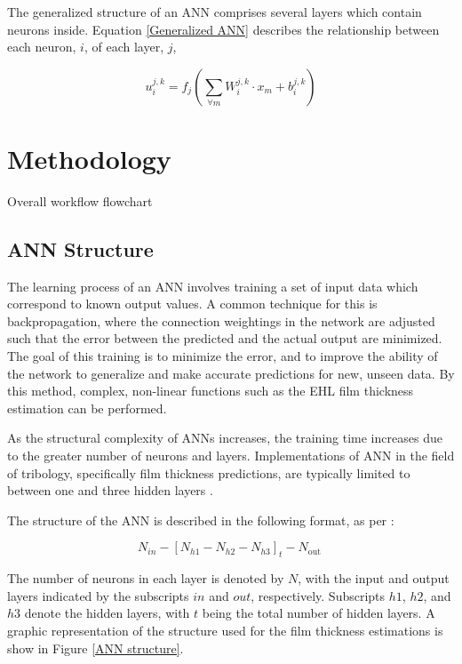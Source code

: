 The generalized structure of an ANN comprises several layers which contain neurons inside. Equation \ref{Generalized ANN} describes the relationship between each neuron, $i$, of each layer, $j$,

\begin{equation}\label{Generalized ANN}
	u_i^{j, k}=f_j\left(\sum_{\forall m} W_i^{j, k} \cdot x_m+b_i^{j, k}\right)
\end{equation}


\section{Methodology}

Overall workflow flowchart

\subsection{ANN Structure}


The learning process of an ANN involves training a set of input data which correspond to known output values. A common technique for this is backpropagation, where the connection weightings in the network are adjusted such that the error between the predicted and the actual output are minimized. The goal of this training is to minimize the error, and to improve the ability of the network to generalize and make accurate predictions for new, unseen data. By this method, complex, non-linear functions such as the EHL film thickness estimation can be performed.

As the structural complexity of ANNs increases, the training time increases due to the greater number of neurons and layers. Implementations of ANN in the field of tribology, specifically film thickness predictions, are typically limited to between one and three hidden layers \cite{Marian2021}.

The structure of the ANN is described in the following format, as per \cite{Zhang2002}:

\begin{equation}
	N_{i n}-\left[N_{h 1}-N_{h 2}-N_{h 3}\right]_t-N_{\text {out }}
\end{equation}

The number of neurons in each layer is denoted by $N$, with the input and output layers indicated by the subscripts $in$ and $out$, respectively. Subscripts $h1$, $h2$, and $h3$ denote the hidden layers, with $t$ being the total number of hidden layers. A graphic representation of the structure used for the film thickness estimations is show in Figure \ref{ANN structure}.

